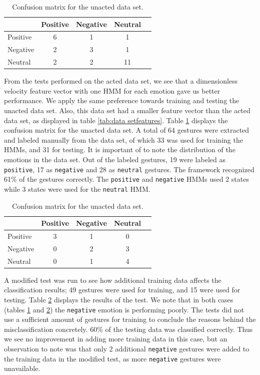 \documentclass[]{report}   %
\begin{document}
\begin{table}[htbp]
	\centering
		\begin{tabular}{|l|c|c|c|c|}
		\hline
             & Positive & Negative & Neutral \\ \hline
        Positive & 6     & 1    & 1     \\ \hline
        Negative  & 2     & 3    & 1      \\ \hline
        Neutral & 2     & 2    & 11     \\ \hline
		\end{tabular}
	\caption{Confusion matrix for the unacted data set.}
	\label{tab:unactedconfuse}
\end{table}

From the tests performed on the acted data set, we see that a dimensionless velocity feature vector with one HMM for each emotion gave us better performance. We apply the same preference towards training and testing the unacted data set. Also, this data set had a smaller feature vector than the acted data set, as displayed in table \ref{tab:data setfeatures}. Table \ref{tab:unactedconfuse} displays the confusion matrix for the unacted data set. A total of 64 gestures were extracted and labeled manually from the data set, of which 33 was used for training the HMMs, and 31 for testing. It is important of to note the distribution of the emotions in the data set. Out of the labeled gestures, 19 were labeled as \texttt{positive}, 17 as \texttt{negative} and 28 as \texttt{neutral} gestures. The framework recognized 61\% of the gestures correctly. The \texttt{positive} and \texttt{negative} HMMs used 2 states while 3 states were used for the \texttt{neutral} HMM.
\begin{table}[htbp]
	\centering
		\begin{tabular}{|l|c|c|c|c|}
		\hline
             & Positive & Negative & Neutral \\ \hline
        Positive & 3     & 1    & 0    \\ \hline
        Negative  & 0     & 2    & 3      \\ \hline
        Neutral & 0     & 1    & 4     \\ \hline
		\end{tabular}
	\caption{Confusion matrix for the unacted data set.}
	\label{tab:unactedconfuse2}
\end{table}

A modified test was run to see how additional training data affects the classification results; 49 gestures were used for training, and 15 were used for testing. Table \ref{tab:unactedconfuse2} displays the results of the test. We note that in both cases (tables \ref{tab:unactedconfuse} and \ref{tab:unactedconfuse2}) the \texttt{negative} emotion is performing poorly. The tests did not use a sufficient amount of gestures for training to conclude the reasons behind the misclassification concretely. 60\% of the testing data was classified correctly. Thus we see no improvement in adding more training data in this case, but an observation to note was that only 2 additional \texttt{negative} gestures were added to the training data in the modified test, as more \texttt{negative} gestures were unavailable.
\end{document}
